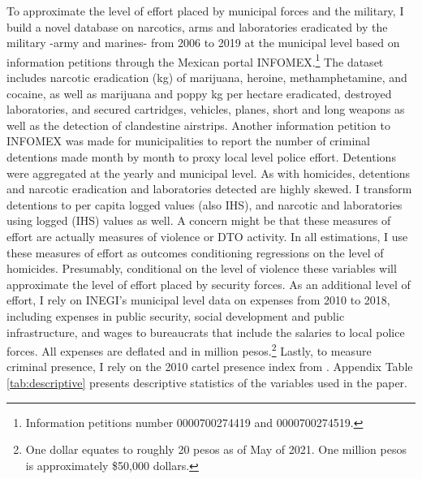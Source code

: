\documentclass[12pt]{amsart}
\makeatletter
\def\section{\@startsection{section}{1}
	\z@{1.0\linespacing\@plus\linespacing}{.5\linespacing}{\Large}}
\numberwithin{equation}{section}
\theoremstyle{definition}
\theoremstyle{definition}
\theoremstyle{definition}
\makeatother
\begin{document}
To approximate the level of effort placed by municipal forces and the military, I build a novel database on narcotics, arms and laboratories eradicated by the military -army and marines- from 2006 to 2019 at the municipal level  based on information petitions through the Mexican portal INFOMEX.\footnote{Information petitions number 0000700274419 and 0000700274519.} The dataset includes narcotic eradication (kg) of marijuana, heroine, methamphetamine, and cocaine, as well as marijuana and poppy kg per hectare eradicated, destroyed laboratories, and secured cartridges, vehicles, planes, short and long weapons as well as the detection of clandestine airstrips.  Another information petition to INFOMEX was made for municipalities to report the number of criminal detentions made month by month to proxy local level police effort. Detentions were aggregated at the yearly and municipal level. As with homicides, detentions and narcotic eradication and laboratories detected are highly skewed. I transform detentions to per capita logged values (also IHS), and narcotic and laboratories using logged (IHS) values as well. A concern might be that these measures of effort are actually measures of violence or DTO activity. In all estimations, I use these measures of effort as outcomes conditioning regressions on the level of homicides. Presumably, conditional on the level of violence these variables will approximate the level of effort placed by security forces. As an additional level of effort,  I rely on INEGI's municipal level data on expenses from 2010 to 2018, including expenses in public security, social development and public infrastructure,  and wages to bureaucrats that include the salaries to local police forces. All expenses are deflated and in million pesos.\footnote{One dollar equates to roughly 20 pesos as of May of 2021. One million pesos is approximately \$50,000 dollars.} Lastly, to measure criminal presence, I rely on the 2010 cartel presence index from \citet{camilo_etal_2018}. 
 Appendix Table \ref{tab:descriptive} presents descriptive statistics of the variables used in the paper.
  
\section{Research Design \label{sec:design}}  
     
\end{document}
